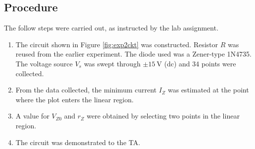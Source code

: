 \documentclass{report}
\begin{document}
\subsection{Procedure}
The follow steps were carried out, as instructed by the lab assignment.
\begin{enumerate}
	\item The circuit shown in Figure \ref{fig:exp2ckt} was constructed. Resistor $R$ was reused from the earlier experiment. The diode used was a Zener-type 1N4735. The voltage source $V_s$ was swept through $\pm \SI{15}{\V}$ (dc) and 34 points were collected.
	\item From the data collected, the minimum current $I_Z$ was estimated at the point where the plot enters the linear region.
	\item A value for $V_{Z0}$ and $r_Z$ were obtained by selecting two points in the linear region.
	\item The circuit was demonstrated to the TA.
\end{enumerate}
\end{document}
